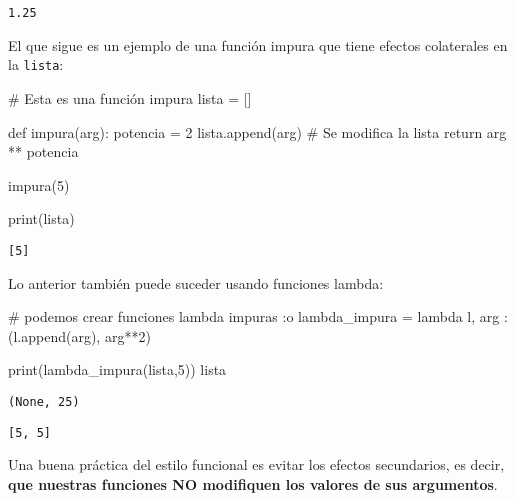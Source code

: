 \documentclass[
  letterpaper,
  DIV=11,
  numbers=noendperiod]{scrreprt}
\newenvironment{Shaded}{\begin{snugshade}}{\end{snugshade}}
\newcommand{\BuiltInTok}[1]{\textcolor[rgb]{0.00,0.23,0.31}{#1}}
\newcommand{\CommentTok}[1]{\textcolor[rgb]{0.37,0.37,0.37}{#1}}
\newcommand{\ControlFlowTok}[1]{\textcolor[rgb]{0.00,0.23,0.31}{#1}}
\newcommand{\DecValTok}[1]{\textcolor[rgb]{0.68,0.00,0.00}{#1}}
\newcommand{\KeywordTok}[1]{\textcolor[rgb]{0.00,0.23,0.31}{#1}}
\newcommand{\NormalTok}[1]{\textcolor[rgb]{0.00,0.23,0.31}{#1}}
\newcommand{\OperatorTok}[1]{\textcolor[rgb]{0.37,0.37,0.37}{#1}}
\begin{document}
\begin{verbatim}
1.25
\end{verbatim}

El que sigue es un ejemplo de una función impura que tiene efectos
colaterales en la \texttt{lista}:

\begin{Shaded}
\begin{Highlighting}[]
\CommentTok{\# Esta es una función impura}
\NormalTok{lista }\OperatorTok{=}\NormalTok{ []}

\KeywordTok{def}\NormalTok{ impura(arg):}
\NormalTok{    potencia }\OperatorTok{=} \DecValTok{2}
\NormalTok{    lista.append(arg) }\CommentTok{\# Se modifica la lista}
    \ControlFlowTok{return}\NormalTok{ arg }\OperatorTok{**}\NormalTok{ potencia}

\NormalTok{impura(}\DecValTok{5}\NormalTok{)}

\BuiltInTok{print}\NormalTok{(lista)}
\end{Highlighting}
\end{Shaded}

\begin{verbatim}
[5]
\end{verbatim}

Lo anterior también puede suceder usando funciones lambda:

\begin{Shaded}
\begin{Highlighting}[]
\CommentTok{\# podemos crear funciones lambda impuras :o}
\NormalTok{lambda\_impura }\OperatorTok{=} \KeywordTok{lambda}\NormalTok{ l, arg : (l.append(arg), arg}\OperatorTok{**}\DecValTok{2}\NormalTok{)}
\end{Highlighting}
\end{Shaded}

\begin{Shaded}
\begin{Highlighting}[]
\BuiltInTok{print}\NormalTok{(lambda\_impura(lista,}\DecValTok{5}\NormalTok{))}
\NormalTok{lista}
\end{Highlighting}
\end{Shaded}

\begin{verbatim}
(None, 25)
\end{verbatim}

\begin{verbatim}
[5, 5]
\end{verbatim}

Una buena práctica del estilo funcional es evitar los efectos
secundarios, es decir, \textbf{que nuestras funciones NO modifiquen los
valores de sus argumentos}.
\end{document}
